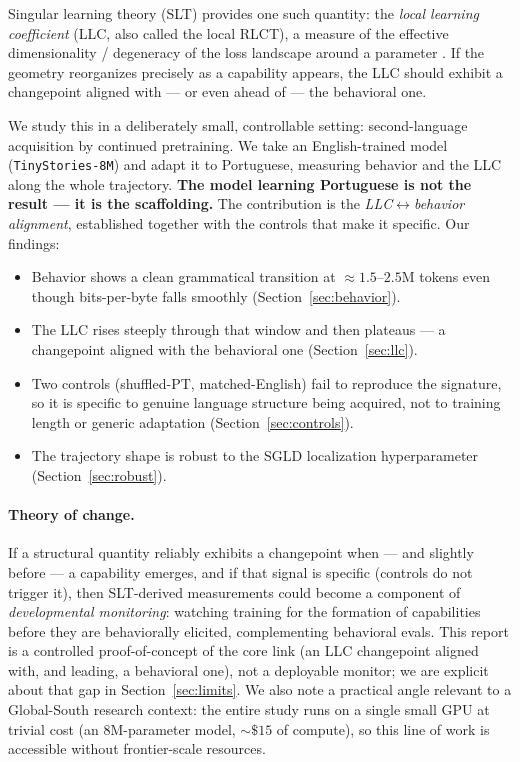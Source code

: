 \documentclass[11pt]{article}
\begin{document}
Singular learning theory (SLT) provides one such quantity: the \emph{local
learning coefficient} (LLC, also called the local RLCT), a measure of the
effective dimensionality / degeneracy of the loss landscape around a parameter
\cite{watanabe2009,lau2024}. If the geometry reorganizes precisely as a
capability appears, the LLC should exhibit a changepoint aligned with --- or even
ahead of --- the behavioral one.

We study this in a deliberately small, controllable setting: second-language
acquisition by continued pretraining. We take an English-trained model
(\texttt{TinyStories-8M}) and adapt it to Portuguese, measuring behavior and the
LLC along the whole trajectory. \textbf{The model learning Portuguese is not the
result --- it is the scaffolding.} The contribution is the
\emph{LLC$\leftrightarrow$behavior alignment}, established together with the
controls that make it specific. Our findings:
\begin{itemize}\itemsep2pt
  \item Behavior shows a clean grammatical transition at $\approx\!1.5$--$2.5$M
  tokens even though bits-per-byte falls smoothly (Section~\ref{sec:behavior}).
  \item The LLC rises steeply through that window and then plateaus --- a
  changepoint aligned with the behavioral one (Section~\ref{sec:llc}).
  \item Two controls (shuffled-PT, matched-English) fail to reproduce the
  signature, so it is specific to genuine language structure being acquired,
  not to training length or generic adaptation (Section~\ref{sec:controls}).
  \item The trajectory shape is robust to the SGLD localization hyperparameter
  (Section~\ref{sec:robust}).
\end{itemize}

\paragraph{Theory of change.} If a structural quantity reliably exhibits a
changepoint when --- and slightly before --- a capability emerges, and if that
signal is specific (controls do not trigger it), then SLT-derived measurements
could become a component of \emph{developmental monitoring}: watching training for
the formation of capabilities before they are behaviorally elicited, complementing
behavioral evals. This report is a controlled proof-of-concept of the core link
(an LLC changepoint aligned with, and leading, a behavioral one), not a deployable
monitor; we are explicit about that gap in Section~\ref{sec:limits}. We also note
a practical angle relevant to a Global-South research context: the entire study
runs on a single small GPU at trivial cost (an 8M-parameter model, ${\sim}\$15$ of
compute), so this line of work is accessible without frontier-scale resources.
\end{document}
